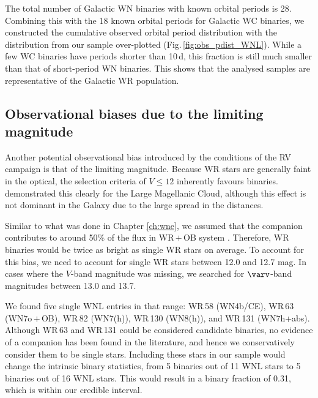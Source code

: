 The total number of Galactic WN binaries with known orbital periods is 28. Combining this with the 18 known orbital periods for Galactic WC binaries, we constructed the cumulative observed orbital period distribution with the distribution from our sample over-plotted (Fig.\,\ref{fig:obs_pdist_WNL}). While a few WC binaries have periods shorter than 10\,d, this fraction is still much smaller than that of short-period WN binaries. This shows that the analysed samples are representative of the Galactic WR population.
\subsection{Observational biases due to the limiting magnitude}  \label{sect:mag}
Another potential observational bias introduced by the conditions of the RV campaign is that of the limiting magnitude. Because WR stars are generally faint in the optical, the selection criteria of $V\le12$ inherently favours binaries. \citet{vanbeveren_binary_1980} demonstrated this clearly for the Large Magellanic Cloud, although this effect is not dominant in the Galaxy due to the large spread in the distances. 

Similar to what was done in Chapter \ref{ch:wne}, we assumed that the companion contributes to around 50\% of the flux in WR\,$+$\,OB system \citep[e.g.,][]{shenar_wolf-rayet_2019}. Therefore, WR binaries would be twice as bright as single WR stars on average. To account for this bias, we need to account for single WR stars between 12.0 and 12.7 mag. In cases where the $V$-band magnitude was missing, we searched for $\varv$-band magnitudes between 13.0 and 13.7. 

We found five single WNL entries in that range: WR\,58 (WN4b/CE), WR\,63 (WN7o\,$+$\,OB), WR\,82 (WN7(h)), WR\,130 (WN8(h)), and WR\,131 (WN7h+abs). Although WR\,63 and WR\,131 could be considered candidate binaries, no evidence of a companion has been found in the literature, and hence we conservatively consider them to be single stars. Including these stars in our sample would change the intrinsic binary statistics, from 5 binaries out of 11 WNL stars to 5 binaries out of 16 WNL stars. This would result in a binary fraction of 0.31, which is within our credible interval. 

